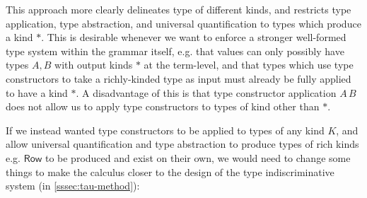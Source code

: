 \documentclass[acmsmall, 9pt]{article}
\begin{document}
\lbreak
This approach more clearly delineates type of different kinds, and restricts type application, type abstraction, and universal quantification to types which produce a kind $*$. This is desirable whenever we want to enforce a stronger well-formed type system within the grammar itself, e.g. that values can only possibly have types $A, B$ with output kinds $*$ at the term-level, and that types which use type constructors to take a richly-kinded type as input must already be fully applied to have a kind $*$. A disadvantage of this is that type constructor application $A\,B$ does not allow us to apply type constructors to types of kind other than $*$.

If we instead wanted type constructors to be applied to types of any kind $K$, and allow universal quantification and type abstraction to produce types of rich kinds e.g. $\mathsf{Row}$ to be produced and exist on their own, we would need to change some things to make the calculus closer to the design of the type indiscriminative system (in \ref{sssec:tau-method}):
\end{document}
